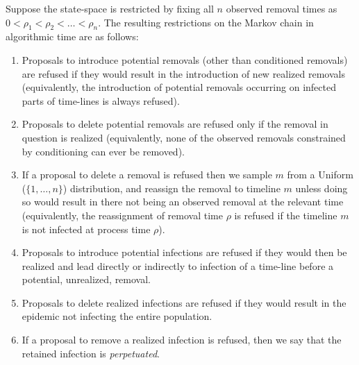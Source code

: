 \documentclass[]{article}
\begin{document}
 Suppose the state-space is restricted by fixing all \(n\) observed removal times as \(0<\rho_1<\rho_2<\ldots<\rho_n\).
 The resulting restrictions on the Markov chain in algorithmic time are as follows:%
 \begin{enumerate}
  \item Proposals to introduce potential removals (other than conditioned removals) are refused if they would result in the introduction of new realized removals 
  (equivalently, the introduction of potential removals occurring on infected parts of time-lines is always refused). 
  \item Proposals to delete potential removals are refused only if the removal in question is realized
  (equivalently, none of the observed removals constrained by
  conditioning can ever be removed). 
\item If a proposal to delete a removal is refused then we sample
  \(m\) from a Uniform (\(\{1,\dots,n\}\)) distribution, and reassign
  the removal to timeline \(m\) unless doing so would result in there
  not being an observed removal at the relevant time (equivalently,
  the reassignment of removal time $\rho$ is refused if the timeline
  \(m\) is not infected at process time $\rho$).%
  \item Proposals to introduce potential infections are refused if they would then be realized and lead directly or indirectly to infection of a time-line before a potential, unrealized, removal.
  \item Proposals to delete realized infections are refused if they would result in the epidemic not infecting the entire population.
  \item[] If a proposal to remove a realized infection is refused, 
  then we say that the retained infection is \emph{perpetuated}. 
 \end{enumerate}
\end{document}
